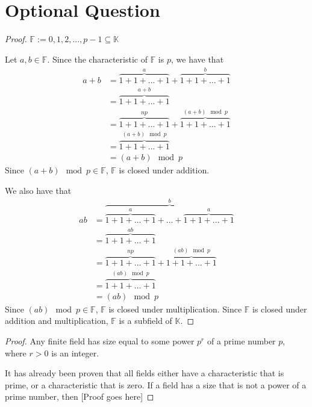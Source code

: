 \section{Optional Question}
\begin{proof}$\mathbb{F} := {0,1,2,...,p-1} \subseteq \mathbb{K}$\gap

    Let $a,b \in \mathbb{F}$.
    Since the characteristic of $\mathbb{F}$ is $p$, we have that
    \begin{align*}
        a + b
        &= \overbrace{1+1+...+1}^{a} + \overbrace{1+1+...+1}^{b}\\
        &= \overbrace{1+1+...+1}^{a+b}\\
        &= \overbrace{1+1+...+1}^{np} + \overbrace{1+1+...+1}^{(a+b) \mod p}\\
        &= \overbrace{1+1+...+1}^{(a+b) \mod p} \\
        &= (a+b) \mod p
    \end{align*}
    Since $(a+b) \mod p \in \mathbb{F}$, 
    $\mathbb{F}$ is closed under addition.\gap

    We also have that
    \begin{align*}
        ab
        &= \overbrace{\overbrace{1+1+...+1}^{a} + ... +\overbrace{1+1+...+1}^{a}}^{b}\\
        &= \overbrace{1+1+...+1}^{ab}\\
        &= \overbrace{1+1+...+1}^{np} + \overbrace{1+1+...+1}^{(ab) \mod p}\\
        &= \overbrace{1+1+...+1}^{(ab) \mod p} \\
        &= (ab) \mod p
    \end{align*}
    Since $(ab) \mod p \in \mathbb{F}$,
    $\mathbb{F}$ is closed under multiplication. 
    Since $\mathbb{F}$ is closed under addition and multiplication,
    $\mathbb{F}$ is a subfield of $\mathbb{K}$.
\end{proof}

\begin{proof} Any finite field has size
    equal to some power $p^r$ of a prime number $p$,
    where $r>0$ is an integer.\gap

    It has already been proven that all fields
    either have a characteristic that is prime,
    or a characteristic that is zero.
    If a field has a size that is 
    not a power of a prime number,
    then
    [Proof goes here]
\end{proof}